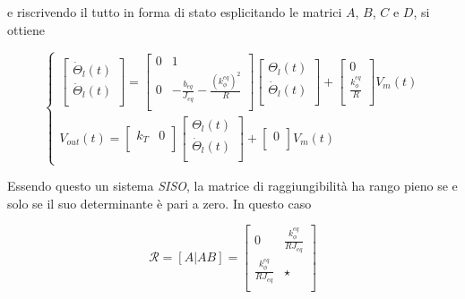 	\noindent e riscrivendo il tutto in forma di stato esplicitando le matrici $A$, $B$, $C$ e $D$, si ottiene
		
	\begin{equation}
		\begin{cases}
			\begin{bmatrix}
				\dot{\Theta}_l(t)  \\
				\ddot{\Theta}_l(t) \\
			\end{bmatrix}
			=
			\begin{bmatrix}
				0 & 1                                  \\
				0 & -\frac{b_{eq}}{J_{eq}}-\frac{(k_{\phi}^{eq})^2}{R} \\
			\end{bmatrix}
			\begin{bmatrix}
				\Theta_l(t)       \\
				\dot{\Theta}_l(t) \\
			\end{bmatrix}	
			+
			\begin{bmatrix}
				0                       \\
				\frac{k_{\phi}^{eq}}{R} \\
			\end{bmatrix}
			V_m(t) \\
			V_{out}(t)=
			\begin{bmatrix}
				k_T & 0 \\
			\end{bmatrix}
			\begin{bmatrix}
				\Theta_l(t)       \\
				\dot{\Theta}_l(t) \\
			\end{bmatrix}
			+
			\begin{bmatrix}
				0 \\
			\end{bmatrix}
			V_m(t)											
		\end{cases}
	\end{equation}
		
	\noindent Essendo questo un sistema \textit{SISO}, la matrice di raggiungibilità ha rango pieno se e solo se il suo determinante è pari a zero. In questo caso
		
	\begin{equation}
		\mathcal{R}=[A|AB]=
		\begin{bmatrix}
			0 & \frac{k_{\phi}^{eq}}{RJ_{eq}} \\
			\frac{k_{\phi}^{eq}}{RJ_{eq}} & \star \\
		\end{bmatrix}
	\end{equation}
		
